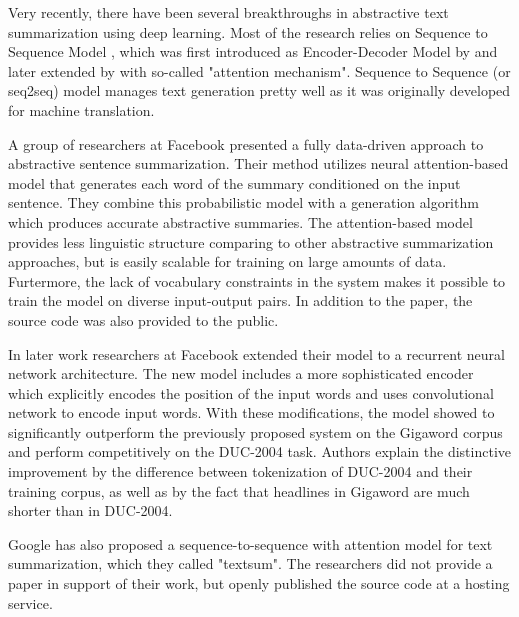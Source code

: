 \documentclass[11pt,a4paper,onecolumn]{article}
\begin{document}
Very recently, there have been several breakthroughs in abstractive text summarization using deep learning.
Most of the research relies on Sequence to Sequence Model \cite{sutskever2014sequence}, which was first introduced as Encoder-Decoder Model by \cite{cho2014learning} and later extended by \cite{bahdanau2014neural} with so-called "attention mechanism".
Sequence to Sequence (or seq2seq) model manages text generation pretty well as it was originally developed for machine translation.

A group of researchers at Facebook \cite{rush2015neural} presented a fully data-driven approach to abstractive sentence summarization.
Their method utilizes neural attention-based model that generates each word of the summary conditioned on the input sentence.
They combine this probabilistic model with a generation algorithm which produces accurate abstractive summaries.
The attention-based model provides less linguistic structure comparing to other abstractive summarization approaches, but is easily scalable for training on large amounts of data.
Furtermore, the lack of vocabulary constraints in the system makes it possible to train the model on diverse input-output pairs.
In addition to the paper, the source code \cite{Namas2015Facebook} was also provided to the public.

In later work \cite{chopra2016abstractive} researchers at Facebook extended their model to a recurrent neural network architecture.
The new model includes a more sophisticated encoder which explicitly encodes the position of the input words and uses convolutional network to encode input words.
With these modifications, the model showed to significantly outperform the previously proposed system on the Gigaword corpus and perform competitively on the DUC-2004 task.
Authors explain the distinctive improvement by the difference between tokenization of DUC-2004 and their training corpus, as well as by the fact that headlines in Gigaword are much shorter than in DUC-2004.

Google has also proposed a sequence-to-sequence with attention model for text summarization, which they called "textsum".
The researchers did not provide a paper in support of their work, but openly published the source code \cite{LiuGoogle2016} at a hosting service.
\end{document}
